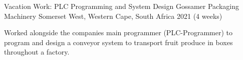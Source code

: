 \begin{cventries}
  \cventry
    {Vacation Work: PLC Programming and System Design} %
    {Gossamer Packaging Machinery} %
    {Somerset West, Western Cape, South Africa} %
    {2021 (4 weeks)} %
    {
      \begin{cvitems} %
        \item {Worked alongside the companies main programmer (PLC-Programmer) to program and design a conveyor system to transport fruit produce in boxes throughout a factory.}
      \end{cvitems}
    }
    


%
%

\end{cventries}
